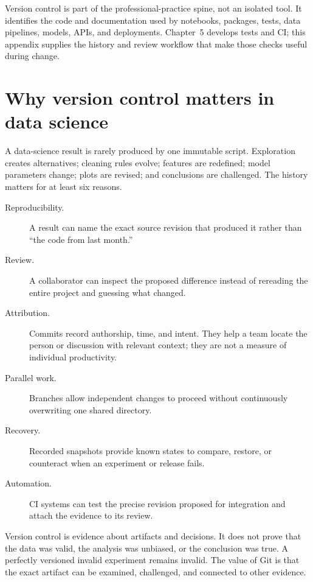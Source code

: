 \begin{chapterconnection}
Version control is part of the professional-practice spine, not an isolated
tool. It identifies the code and documentation used by notebooks, packages,
tests, data pipelines, models, APIs, and deployments. Chapter~5 develops tests
and CI; this appendix supplies the history and review workflow that make those
checks useful during change.
\end{chapterconnection}

\section{Why version control matters in data science}

A data-science result is rarely produced by one immutable script. Exploration
creates alternatives; cleaning rules evolve; features are redefined; model
parameters change; plots are revised; and conclusions are challenged. The
history matters for at least six reasons.

\begin{description}
  \item[Reproducibility.] A result can name the exact source revision that
  produced it rather than ``the code from last month.''
  \item[Review.] A collaborator can inspect the proposed difference instead of
  rereading the entire project and guessing what changed.
  \item[Attribution.] Commits record authorship, time, and intent. They help a
  team locate the person or discussion with relevant context; they are not a
  measure of individual productivity.
  \item[Parallel work.] Branches allow independent changes to proceed without
  continuously overwriting one shared directory.
  \item[Recovery.] Recorded snapshots provide known states to compare, restore,
  or counteract when an experiment or release fails.
  \item[Automation.] CI systems can test the precise revision proposed for
  integration and attach the evidence to its review.
\end{description}

Version control is evidence about artifacts and decisions. It does not prove
that the data was valid, the analysis was unbiased, or the conclusion was true.
A perfectly versioned invalid experiment remains invalid. The value of Git is
that the exact artifact can be examined, challenged, and connected to other
evidence.

